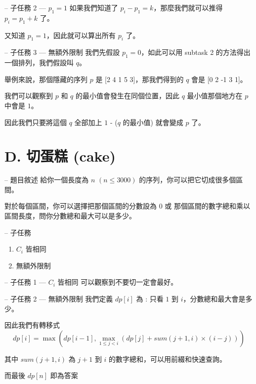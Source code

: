 \documentclass[hyperref,UTF8,notheorems,xcolor={dvipsnames}]{beamer}
\newcommand{\btitle}[1]{{\secname} -- #1}
\theoremstyle{definition}
\begin{document}
\begin{frame}[fragile]{\btitle{子任務 2 --- $p_1 = 1$}}
	如果我們知道了 $p_i - p_1 = k$，那麼我們就可以推得 $p_i = p_1 + k$ 了。
	
	又知道 $p_1 = 1$，因此就可以算出所有 $p_i$ 了。
\end{frame}

\begin{frame}[fragile]{\btitle{子任務 3 --- 無額外限制}}
	我們先假設 $p_1 = 0$，如此可以用 subtask 2 的方法得出一個排列，我們假設叫 $q$。
	\pause

	舉例來說，那個隱藏的序列 $p$ 是 [2 4 1 5 3]，那我們得到的 $q$ 會是 [0 2 -1 3 1]。
	\pause

	我們可以觀察到 $p$ 和 $q$ 的最小值會發生在同個位置，因此 $q$ 最小值那個地方在 $p$ 中會是 $1$。
	
	因此我們只要將這個 $q$ 全部加上 $1$ - ($q$ 的最小值) 就會變成 $p$ 了。

\end{frame}



\section{D.  切蛋糕 (cake)}

\begin{frame}[fragile]{\btitle{題目敘述}}
	給你一個長度為 $n$ $(n \le 3000)$ 的序列，你可以把它切成很多個區間。
	
	對於每個區間，你可以選擇把那個區間的分數設為 $0$ 或 那個區間的數字總和乘以區間長度，問你分數總和最大可以是多少。
\end{frame}

\begin{frame}[fragile]{\btitle{子任務}}
	\begin{enumerate}
		\item $C_i$ 皆相同
		\item 無額外限制
	\end{enumerate}
\end{frame}

\begin{frame}[fragile]{\btitle{子任務 1 --- $C_i$ 皆相同}}
	可以觀察到不要切一定會最好。
\end{frame}

\begin{frame}[fragile]{\btitle{子任務 2 --- 無額外限制}}
	我們定義 $dp[i]$ 為 : 只看 $1$ 到 $i$，分數總和最大會是多少。  
	\pause

	因此我們有轉移式 $$dp[i] = \max(dp[i - 1], \max_{1 \le j < i}{(dp[j] + sum(j + 1, i) \times (i - j))})$$

	其中 $sum(j + 1, i)$ 為 $j + 1$ 到 $i$ 的數字總和，可以用前綴和快速查詢。

	而最後 $dp[n]$ 即為答案

\end{frame}
\end{document}
